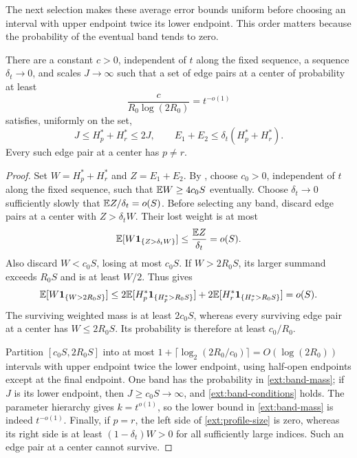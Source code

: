 The next selection makes these average error bounds uniform before
choosing an interval with upper endpoint twice its lower endpoint.  This order matters because the probability of
the eventual band tends to zero.

\begin{lemma}\label{ext:band}
There are a constant \(c>0\), independent of \(t\) along the fixed
sequence, a sequence \(\delta_t\to0\), and scales \(J\to\infty\) such
that a set of edge pairs at a center of probability at least
\begin{equation}\label{ext:band-mass}
 \frac{c}{R_0\log(2R_0)}=t^{-o(1)}
\end{equation}
satisfies, uniformly on the set,
\begin{equation}\label{ext:band-conditions}
 J\le H_p^*+H_r^*\le2J,\qquad
 E_1+E_2\le\delta_t(H_p^*+H_r^*).
\end{equation}
Every such edge pair at a center has \(p\ne r\).
\end{lemma}

\begin{proof}
Set \(W=H_p^*+H_r^*\) and \(Z=E_1+E_2\).  By
, choose \(c_0>0\), independent of \(t\) along
the fixed sequence, such that \(\mathbb E W\ge4c_0S\) eventually.
Choose \(\delta_t\to0\) sufficiently
slowly that \(\mathbb E Z/\delta_t=o(S)\).  Before selecting any band, discard
edge pairs at a center with \(Z>\delta_tW\).  Their lost weight is at most
\[
 \mathbb E[W\mathbf1_{\{Z>\delta_tW\}}]\le\frac{\mathbb E Z}{\delta_t}=o(S).
\]
Also discard \(W<c_0S\), losing at most \(c_0S\).
If \(W>2R_0S\), its larger summand exceeds \(R_0S\) and is at least
\(W/2\).  Thus  gives
\[
 \mathbb E[W\mathbf1_{\{W>2R_0S\}}]
 \le2\mathbb E[H_p^*\mathbf1_{\{H_p^*>R_0S\}}]
    +2\mathbb E[H_r^*\mathbf1_{\{H_r^*>R_0S\}}]=o(S).
\]
The surviving weighted mass is at least \(2c_0S\), whereas every
surviving edge pair at a center has \(W\le2R_0S\).  Its probability is therefore at
least \(c_0/R_0\).

Partition \([c_0S,2R_0S]\) into at most
\(1+\lceil\log_2(2R_0/c_0)\rceil=O(\log(2R_0))\) intervals with upper endpoint twice the lower endpoint,
using half-open endpoints except at the final endpoint.  One band has
the probability in \eqref{ext:band-mass}; if \(J\) is its lower endpoint,
then \(J\ge c_0S\to\infty\), and \eqref{ext:band-conditions} holds.
The parameter hierarchy gives \(k=t^{o(1)}\), so the lower bound in
\eqref{ext:band-mass} is indeed \(t^{-o(1)}\).
Finally, if \(p=r\), the left side of \eqref{ext:profile-size} is zero,
whereas its right side is at least \((1-\delta_t)W>0\) for all
sufficiently large indices.  Such an edge pair at a center cannot survive.
\end{proof}

